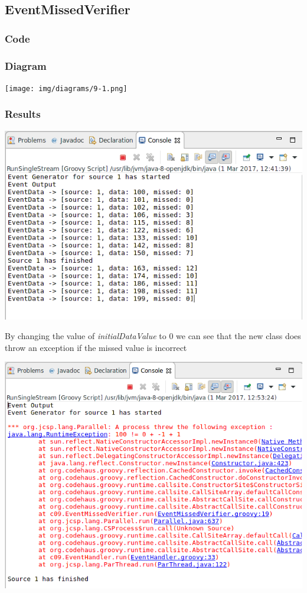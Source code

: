 \subsection{EventMissedVerifier}

\subsubsection*{Code}



\subsubsection*{Diagram}

\texttt{[image: img/diagrams/9-1.png]}

\subsubsection*{Results}

\includegraphics[width=\textwidth]{img/screenshots/9-1-1.png}

By changing the value of \textit{initialDataValue} to 0 we can see that the new class does throw an exception if the missed value is incorrect

\includegraphics[width=\textwidth]{img/screenshots/9-1-2.png}
